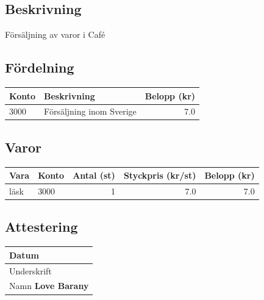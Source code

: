 \documentclass{article}
\newcommand{\namn}{Love Barany}
\newcommand{\beskrivning}{Försäljning av varor i Café}\newcommand{\fordelning}{3000 & Försäljning inom Sverige & 7.0\\}\newcommand{\varor}{läsk & 3000 & 1 & 7.0 & 7.0\\}
\begin{document}
    \subsection*{Beskrivning}
    \beskrivning

    \subsection*{Fördelning}
    \begin{tabular}{p{0.6in}p{2in}r}
        Konto & Beskrivning& Belopp (kr)\\ \hline
        \fordelning
    \end{tabular}

    \subsection*{Varor}
    \begin{longtable}[l]{llrrr}
        Vara & Konto & Antal (st) & Styckpris (kr/st) & Belopp (kr) \\ \hline
        \varor
    \end{longtable}

    \subsection*{Attestering}
    \begin{tabular}{|p{2.5in}|}
        \hline
        {\footnotesize Datum} \newline \\
        \hline
        {\footnotesize Underskrift} \newline \newline\\
        \hline
        {\footnotesize Namn} \newline \textbf{\namn} \\
        \hline
    \end{tabular}
    
\end{document}
